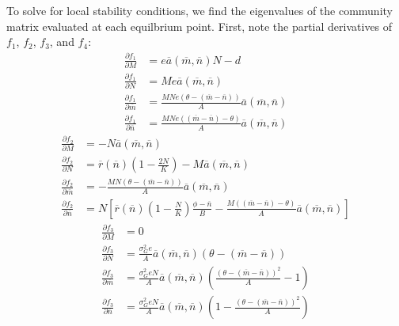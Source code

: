 \documentclass{amsart}
\theoremstyle{definition}
\theoremstyle{remark}
\numberwithin{equation}{section}
\begin{document}
To solve for local stability conditions, we find the eigenvalues of the community matrix evaluated at each equilbrium point.  First, note the partial derivatives of $f_1$, $f_2$, $f_3$, and $f_4$:
\begin{align*}
	\frac{\partial f_1}{\partial M} &= e\overline{a}(\overline{m}, \overline{n})N - d\\[5px]
	\frac{\partial f_1}{\partial N} &= Me\overline{a}(\overline{m}, \overline{n})\\[5px]
	\frac{\partial f_1}{\partial \overline{m}} &= \frac{MNe(\theta - (\overline{m} - \overline{n}))}{A}\overline{a}(\overline{m}, \overline{n}) \\[5px]
	\frac{\partial f_1}{\partial \overline{n}} &= \frac{MNe((\overline{m} - \overline{n}) - \theta)}{A}\overline{a}(\overline{m}, \overline{n})
\end{align*}
\begin{align*}
	\frac{\partial f_2}{\partial M} &= -N\overline{a}(\overline{m}, \overline{n}) \\[5px]
	\frac{\partial f_2}{\partial N} &= \overline{r}(\overline{n})\left(1 - \frac{2N}{K}\right) - M\overline{a}(\overline{m}, \overline{n})\\[5px]
	\frac{\partial f_2}{\partial \overline{m}} &= -\frac{MN(\theta - (\overline{m} - \overline{n}))}{A}\overline{a}(\overline{m}, \overline{n}) \\[5px]
	\frac{\partial f_2}{\partial \overline{n}} &= N\left[\overline{r}(\overline{n})\left(1 - \frac{N}{K}\right)\frac{\phi - \overline{n}}{B}- \frac{M((\overline{m} - \overline{n}) - \theta)}{A}\overline{a}(\overline{m}, \overline{n})\right]
\end{align*}
\begin{align*}
	\frac{\partial f_3}{\partial M} &= 0 \\[5px]
	\frac{\partial f_3}{\partial N} &= \frac{\sigma_{G}^2e}{A}\overline{a}(\overline{m}, \overline{n})(\theta - (\overline{m} - \overline{n})) \\[5px]
	\frac{\partial f_3}{\partial \overline{m}} &= \frac{\sigma_G^2eN}{A}\overline{a}(\overline{m}, \overline{n})\left(\frac{(\theta - (\overline{m} - \overline{n}))^2}{A} - 1\right)\\[5px]
	\frac{\partial f_3}{\partial \overline{n}} &= \frac{\sigma_G^2eN}{A}\overline{a}(\overline{m}, \overline{n})\left(1 - \frac{(\theta - (\overline{m} - \overline{n}))^2}{A}\right)
\end{align*}
\end{document}
